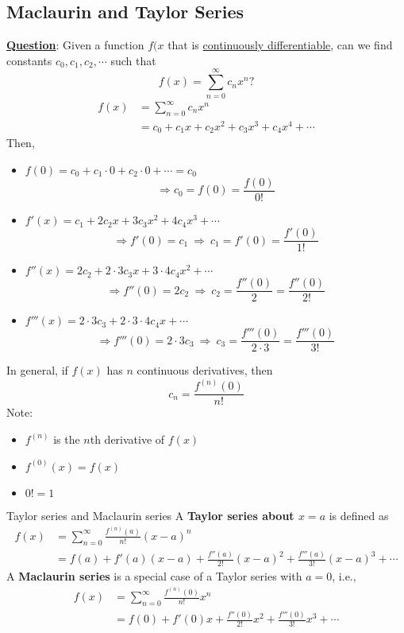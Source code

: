 \documentclass[12pt,a4paper]{article}
\begin{document}
\subsection{Maclaurin and Taylor Series}\label{taylor}
\textbf{\underline{Question}}: Given a function $f(x$ that is \underline{continuously differentiable}, can we find constants $c_0, c_1, c_2,\cdots$ such that $$f(x)=\sum^\infty_{n=0}c_nx^n?$$
$$\begin{aligned}
	f(x)&=\sum^\infty_{n=0}c_nx^n\\
	&=c_0+c_1x+c_2x^2+c_3x^3+c_4x^4+\cdots
\end{aligned}$$
Then, 
\begin{itemize}
	\item $f(0)=c_0+c_1\cdot0+c_2\cdot0+\cdots=c_0$ $$\Rightarrow c_0=f(0)=\frac{f(0)}{0!}$$
	\item $f'(x)=c_1+2c_2x+3c_3x^2+4c_4x^3+\cdots$ $$\Rightarrow f'(0)=c_1\ \Rightarrow\ c_1=f'(0)=\frac{f'(0)}{1!}$$
	\item $f''(x)=2c_2+2\cdot3c_3x+3\cdot4c_4x^2+\cdots$ $$\Rightarrow f''(0)=2c_2\ \Rightarrow\ c_2=\frac{f''(0)}{2}=\frac{f''(0)}{2!}$$
	\item $f'''(x)=2\cdot3c_3+2\cdot3\cdot4c_4x+\cdots$ $$\Rightarrow f'''(0)=2\cdot3c_3\ \Rightarrow\ c_3=\frac{f'''(0)}{2\cdot3}=\frac{f'''(0)}{3!}$$
\end{itemize}
In general, if $f(x)$ has $n$ continuous derivatives, then $$c_n=\frac{f^{(n)}(0)}{n!}$$
Note: 
\begin{itemize}
	\item $f^{(n)}$ is the $n$th derivative of $f(x)$
	\item $f^{(0)}(x)=f(x)$
	\item $0!=1$
\end{itemize}
\begin{df}{Taylor series and Maclaurin series}
	A \textbf{Taylor series about $x=a$} is defined as
	$$\begin{aligned}
		f(x)&=\sum^\infty_{n=0}\frac{f^{(n)}(a)}{n!}(x-a)^n\\
		&=f(a)+f'(a)(x-a)+\frac{f''(a)}{2!}(x-a)^2+\frac{f'''(a)}{3!}(x-a)^3+\cdots
	\end{aligned}$$	
	A \textbf{Maclaurin series} is a special case of a Taylor series with $a=0$, i.e., 
	$$\begin{aligned}
		f(x)&=\sum^\infty_{n=0}\frac{f^{(n)}(0)}{n!}x^n\\
		&=f(0)+f'(0)x+\frac{f''(0)}{2!}x^2+\frac{f'''(0)}{3!}x^3+\cdots
	\end{aligned}$$
\end{df}
\end{document}
